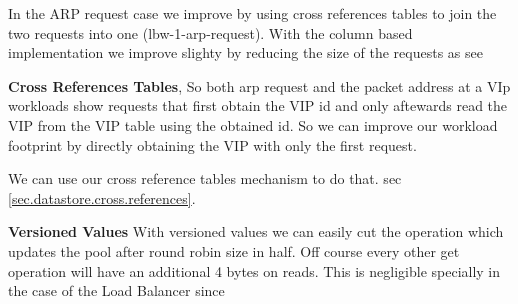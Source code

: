 \begin{figure}[ht]


\begin{floatrow}


\end{floatrow}
\end{figure}



In the ARP request case  we improve by using cross references tables
to join the two requests into one (lbw-1-arp-request). With the column
based implementation we improve slighty by reducing the size of the
requests as see 

\textbf{Cross References Tables}, So both arp request and the packet address at a VIp workloads show
requests that first obtain the VIP id and only aftewards read the VIP
from the VIP table using the obtained id. So we can improve our
workload footprint by directly obtaining the VIP with only the first
request. 

We can use our cross reference tables mechanism to do that. sec
\ref{sec.datastore.cross.references}. 

\textbf{Versioned Values} With versioned values we can easily  cut the operation which updates
the pool after round robin size in half.  Off course every other get
operation will have an additional 4 bytes on reads. This is negligible  specially in the case of the Load Balancer
since 


